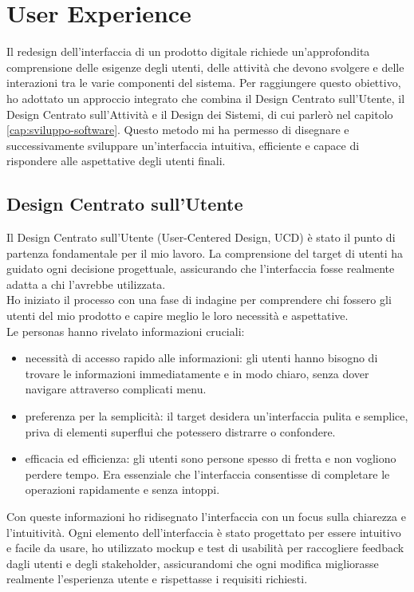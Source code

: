 \chapter{User Experience}
\label{cap:user-experience}

Il redesign dell'interfaccia di un prodotto digitale richiede un'approfondita comprensione delle esigenze degli utenti, delle attività che devono svolgere e delle interazioni tra le varie componenti del sistema. Per raggiungere questo obiettivo, ho adottato un approccio integrato che combina il Design Centrato sull'Utente, il Design Centrato sull'Attività e il Design dei Sistemi, di cui parlerò nel capitolo \ref{cap:sviluppo-software}. Questo metodo mi ha permesso di disegnare e successivamente sviluppare un'interfaccia intuitiva, efficiente e capace di rispondere alle aspettative degli utenti finali.

\section{Design Centrato sull'Utente}

Il Design Centrato sull'Utente (User-Centered Design, UCD) è stato il punto di partenza fondamentale per il mio lavoro. La comprensione del target di utenti ha guidato ogni decisione progettuale, assicurando che l'interfaccia fosse realmente adatta a chi l'avrebbe utilizzata.\\
Ho iniziato il processo con una fase di indagine per comprendere chi fossero gli utenti del mio prodotto e capire meglio le loro necessità e aspettative.\\

Le personas hanno rivelato informazioni cruciali:
\begin{itemize}
    \item necessità di accesso rapido alle informazioni: gli utenti hanno bisogno di trovare le informazioni immediatamente e in modo chiaro, senza dover navigare attraverso complicati menu.
    \item preferenza per la semplicità: il target desidera un'interfaccia pulita e semplice, priva di elementi superflui che potessero distrarre o confondere.
    \item efficacia ed efficienza: gli utenti sono persone spesso di fretta e non vogliono perdere tempo. Era essenziale che l'interfaccia consentisse di completare le operazioni rapidamente e senza intoppi.
\end{itemize}

Con queste informazioni ho ridisegnato l'interfaccia con un focus sulla chiarezza e l'intuitività. Ogni elemento dell'interfaccia è stato progettato per essere intuitivo e facile da usare, ho utilizzato mockup e test di usabilità per raccogliere feedback dagli utenti e degli stakeholder, assicurandomi che ogni modifica migliorasse realmente l'esperienza utente e rispettasse i requisiti richiesti.

